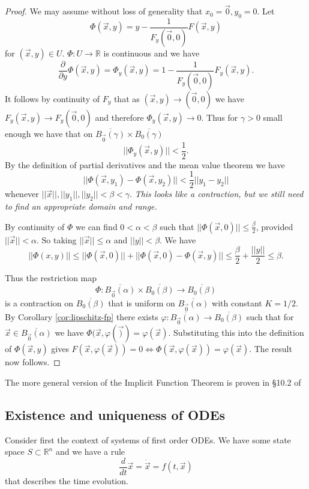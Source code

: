 \documentclass[10pt]{article}
\theoremstyle{definition}
\theoremstyle{remark}
\newcommand{\bbR}{\mathbb{R}}
\begin{document}
\begin{proof}
  We may assume without loss of generality that $x_0=\vec 0,y_0=0$. Let \[\Phi(\vec x,y) = y-\frac{1}{F_y(\vec 0,0)}F(\vec x,y)\] for $(\vec x,y)\in U$. $\Phi:U \to \bbR$ is continuous and we have\[
    \frac{\partial}{\partial y} \Phi(\vec x,y)= \Phi_y(\vec x,y) = 1 -\frac{1}{F_y(\vec 0,0)}F_y(\vec x,y). 
  \] It follows by continuity of $F_y$ that as $(\vec x,y) \to (\vec 0,0)$ we have $F_y(\vec x,y) \to F_y(\vec 0,0)$ and therefore $\Phi_y(\vec x,y) \to 0$. Thus for $\gamma>0$ small enough we have that on $\overline{B_{\vec 0}(\gamma)}\times\overline{B_{0}(\gamma)}$
  \[
    ||\Phi_y(\vec x,y)||<\frac 1 2.
  \]
  By the definition of partial derivatives and the mean value theorem we have \begin{equation}\label{eqn:contract}
    ||\Phi(\vec x,y_1) - \Phi(\vec x,y_2)|| < \frac 1 2 ||y_1-y_2||
  \end{equation} whenever $||\vec x||,||y_1||,||y_2|| <\beta<\gamma$. \emph{This looks like a contraction, but we still need to find an appropriate domain and range.}

  By continuity of $\Phi$ we can find $0<\alpha<\beta$ such that $||\Phi(\vec x,0)|| \leq \frac \beta 2$, provided $||\vec x ||<\alpha$.  So taking $||\vec x||\leq \alpha$ and $||y||<\beta$. We have\[
    ||\Phi(x,y)|| \leq ||\Phi(\vec x,0)||+ ||\Phi(\vec x,0)-\Phi(\vec x,y)|| \leq \frac{\beta}{2}+\frac{||y||}{2} \leq \beta.
  \]

  Thus the restriction map \[\Phi: \overline{B_{\vec 0}(\alpha)}\times \overline{B_0(\beta)} \to \overline{B_0(\beta)}\] is a contraction on $\overline{B_0(\beta)}$ that is uniform on $\overline{B_{\vec 0}(\alpha)}$ with constant $K=1/2$. By Corollary \ref{cor:lipschitz-fp} there exists $\varphi:\overline{B_{\vec 0}(\alpha)} \to \overline{B_0(\beta)}$ such that for  $\vec x \in \overline{B_{\vec 0}(\alpha)}$ we have $\Phi(\vec x,\varphi(\vec)) = \varphi(\vec x)$. Substituting this into the definition of $\Phi(\vec x,y)$ gives $F(\vec x,\varphi(\vec x))=0 \Leftrightarrow \Phi(\vec x,\varphi(\vec x))=\varphi(\vec x)$. The result now follows.
\end{proof}

The more general version of the Implicit Function Theorem is proven in \S10.2 of \cite{Krantz}

\subsection{Existence and uniqueness of ODEs}
Consider first the context of systems of first order ODEs. We have some state space $S\subset \mathbb R^n$ and we have a rule\begin{equation}\label{eq:ODE}
  \frac{d}{dt}\vec x= \dot{\vec x} = f(t,\vec x)
\end{equation} that describes the time evolution.
\end{document}
